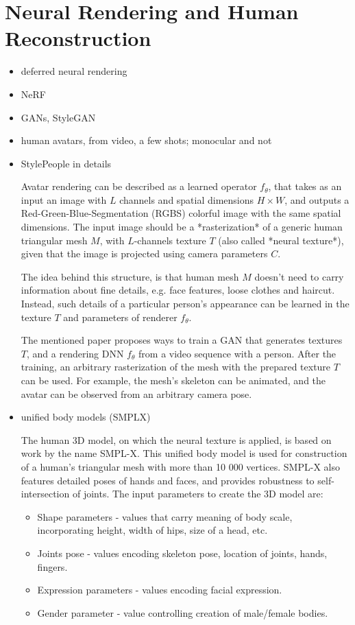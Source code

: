 \section{Neural Rendering and Human Reconstruction}
\label{lit:nrender}
\begin{itemize}
	\item deferred neural rendering \cite{dnn:deferred19}
	\item NeRF \cite{dnn:nerf20,dnn:phorhum22}
	\item GANs, StyleGAN \cite{dnn:gan14, dnn:stylegan-v1-19,dnn:stylegan-v2-20,dnn:stylegan-v3-21,survey:gans:18}
	\item human avatars, from video, a few shots; monocular and not \cite{dnn:volumetric-primitives21}
	\item StylePeople in details \cite{dnn:stylepeople21}
	
	Avatar rendering can be described as a learned operator $f_\theta$, that takes as an input an image with $L$ channels and spatial dimensions $H \times W$, and outputs a Red-Green-Blue-Segmentation (RGBS) colorful image with the same spatial dimensions. The input image should be a *rasterization* of a generic human triangular mesh $M$, with $L$-channels texture $T$ (also called *neural texture*), given that the image is projected using camera parameters $C$. 
	
	The idea behind this structure, is that human mesh $M$ doesn't need to carry information about fine details, e.g. face features, loose clothes and haircut. Instead, such details of a particular person's appearance can be learned in the texture $T$ and parameters of renderer $f_\theta$. 
	
	The mentioned paper proposes ways to train a GAN that generates textures $T$, and a rendering DNN $f_\theta$ from a video sequence with a person. After the training, an arbitrary rasterization of the mesh with the prepared texture $T$ can be used. For example, the mesh's skeleton can be animated, and the avatar can be observed from an arbitrary camera pose. 
	
	\item unified body models (SMPLX) \cite{dnn:smpl15, dnn:smplify16, dnn:smplx19}
	
	The human 3D model, on which the neural texture is applied, is based on work by the name SMPL-X. This unified body model is used for construction of a human's triangular mesh with more than 10 000 vertices. SMPL-X also features detailed poses of hands and faces, and provides robustness to self-intersection of joints. The input parameters to create the 3D model are:
	\begin{itemize}
		\item  Shape parameters - values that carry meaning of body scale, incorporating height, width of hips, size of a head, etc.
		\item  Joints pose - values encoding skeleton pose, location of joints, hands, fingers.
		\item  Expression parameters - values encoding facial expression.
		\item  Gender parameter - value controlling creation of male/female bodies.
	\end{itemize}


\end{itemize}
